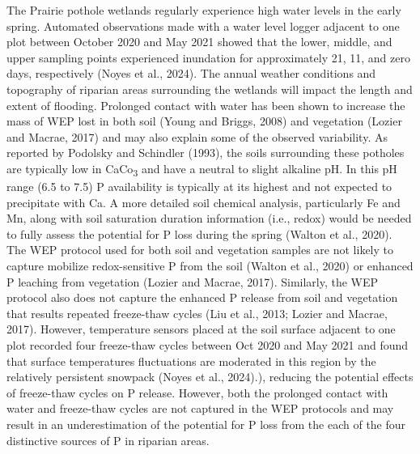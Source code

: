 \documentclass[
]{agujournal2019}
\begin{document}
The Prairie pothole wetlands regularly experience high water levels in
the early spring. Automated observations made with a water level logger
adjacent to one plot between October 2020 and May 2021 showed that the
lower, middle, and upper sampling points experienced inundation for
approximately 21, 11, and zero days, respectively (Noyes et al., 2024).
The annual weather conditions and topography of riparian areas
surrounding the wetlands will impact the length and extent of flooding.
Prolonged contact with water has been shown to increase the mass of WEP
lost in both soil (Young and Briggs, 2008) and vegetation (Lozier and
Macrae, 2017) and may also explain some of the observed variability. As
reported by Podolsky and Schindler (1993), the soils surrounding these
potholes are typically low in CaCo\textsubscript{3} and have a neutral
to slight alkaline pH. In this pH range (6.5 to 7.5) P availability is
typically at its highest and not expected to precipitate with Ca. A more
detailed soil chemical analysis, particularly Fe and Mn, along with soil
saturation duration information (i.e., redox) would be needed to fully
assess the potential for P loss during the spring (Walton et al., 2020).
The WEP protocol used for both soil and vegetation samples are not
likely to capture mobilize redox-sensitive P from the soil (Walton et
al., 2020) or enhanced P leaching from vegetation (Lozier and Macrae,
2017). Similarly, the WEP protocol also does not capture the enhanced P
release from soil and vegetation that results repeated freeze-thaw
cycles (Liu et al., 2013; Lozier and Macrae, 2017). However, temperature
sensors placed at the soil surface adjacent to one plot recorded four
freeze-thaw cycles between Oct 2020 and May 2021 and found that surface
temperatures fluctuations are moderated in this region by the relatively
persistent snowpack (Noyes et al., 2024).), reducing the potential
effects of freeze-thaw cycles on P release. However, both the prolonged
contact with water and freeze-thaw cycles are not captured in the WEP
protocols and may result in an underestimation of the potential for P
loss from the each of the four distinctive sources of P in riparian
areas.
\end{document}
